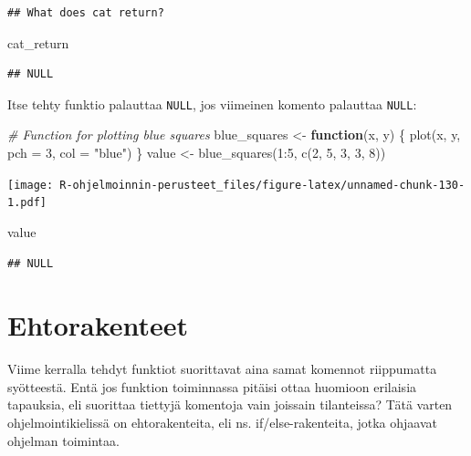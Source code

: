 \documentclass[
]{book}
\newenvironment{Shaded}{\begin{snugshade}}{\end{snugshade}}
\newcommand{\AttributeTok}[1]{\textcolor[rgb]{0.77,0.63,0.00}{#1}}
\newcommand{\CommentTok}[1]{\textcolor[rgb]{0.56,0.35,0.01}{\textit{#1}}}
\newcommand{\ControlFlowTok}[1]{\textcolor[rgb]{0.13,0.29,0.53}{\textbf{#1}}}
\newcommand{\DecValTok}[1]{\textcolor[rgb]{0.00,0.00,0.81}{#1}}
\newcommand{\FunctionTok}[1]{\textcolor[rgb]{0.00,0.00,0.00}{#1}}
\newcommand{\NormalTok}[1]{#1}
\newcommand{\OtherTok}[1]{\textcolor[rgb]{0.56,0.35,0.01}{#1}}
\newcommand{\SpecialCharTok}[1]{\textcolor[rgb]{0.00,0.00,0.00}{#1}}
\newcommand{\StringTok}[1]{\textcolor[rgb]{0.31,0.60,0.02}{#1}}
\begin{document}
\begin{verbatim}
## What does cat return?
\end{verbatim}

\begin{Shaded}
\begin{Highlighting}[]
\NormalTok{cat\_return}
\end{Highlighting}
\end{Shaded}

\begin{verbatim}
## NULL
\end{verbatim}

Itse tehty funktio palauttaa \texttt{NULL}, jos viimeinen komento palauttaa \texttt{NULL}:

\begin{Shaded}
\begin{Highlighting}[]
\CommentTok{\# Function for plotting blue squares}
\NormalTok{blue\_squares }\OtherTok{\textless{}{-}} \ControlFlowTok{function}\NormalTok{(x, y) \{}
  \FunctionTok{plot}\NormalTok{(x, y, }\AttributeTok{pch =} \DecValTok{3}\NormalTok{, }\AttributeTok{col =} \StringTok{"blue"}\NormalTok{)}
\NormalTok{\}}
\NormalTok{value }\OtherTok{\textless{}{-}} \FunctionTok{blue\_squares}\NormalTok{(}\DecValTok{1}\SpecialCharTok{:}\DecValTok{5}\NormalTok{, }\FunctionTok{c}\NormalTok{(}\DecValTok{2}\NormalTok{, }\DecValTok{5}\NormalTok{, }\DecValTok{3}\NormalTok{, }\DecValTok{3}\NormalTok{, }\DecValTok{8}\NormalTok{))}
\end{Highlighting}
\end{Shaded}

\texttt{[image: R-ohjelmoinnin-perusteet\_files/figure-latex/unnamed-chunk-130-1.pdf]}

\begin{Shaded}
\begin{Highlighting}[]
\NormalTok{value}
\end{Highlighting}
\end{Shaded}

\begin{verbatim}
## NULL
\end{verbatim}

\hypertarget{ifelse}{%
\chapter{Ehtorakenteet}\label{ifelse}}

Viime kerralla tehdyt funktiot suorittavat aina samat komennot riippumatta syötteestä. Entä jos funktion toiminnassa pitäisi ottaa huomioon erilaisia tapauksia, eli suorittaa tiettyjä komentoja vain joissain tilanteissa? Tätä varten ohjelmointikielissä on ehtorakenteita, eli ns. if/else-rakenteita, jotka ohjaavat ohjelman toimintaa.
\end{document}
